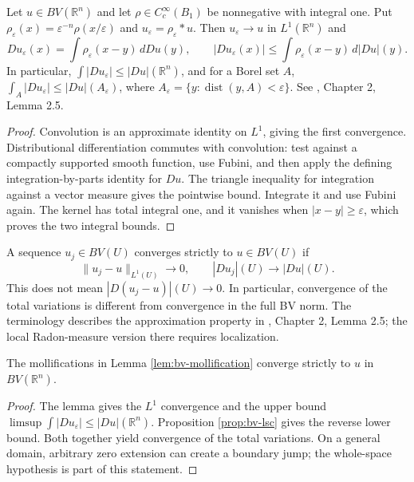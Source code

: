 \begin{lemma}\label{lem:bv-mollification}
Let $u\in BV(\mathbb R^n)$ and let $\rho\in C_c^\infty(B_1)$ be nonnegative with integral one. Put $\rho_\varepsilon(x)=\varepsilon^{-n}\rho(x/\varepsilon)$ and $u_\varepsilon=\rho_\varepsilon*u$. Then $u_\varepsilon\to u$ in $L^1(\mathbb R^n)$ and
\[
 Du_\varepsilon(x)=\int\rho_\varepsilon(x-y)\,dDu(y),
 \qquad |Du_\varepsilon(x)|\leq\int\rho_\varepsilon(x-y)\,d|Du|(y).
\]
In particular, $\int|Du_\varepsilon|\leq|Du|(\mathbb R^n)$, and for a Borel set $A$, $\int_A|Du_\varepsilon|\leq|Du|(A_\varepsilon)$, where $A_\varepsilon=\{y:\operatorname{dist}(y,A)<\varepsilon\}$. See \cite{Sim18}, Chapter 2, Lemma 2.5.
\end{lemma}
\begin{proof}
Convolution is an approximate identity on $L^1$, giving the first convergence. Distributional differentiation commutes with convolution: test against a compactly supported smooth function, use Fubini, and then apply the defining integration-by-parts identity for $Du$. The triangle inequality for integration against a vector measure gives the pointwise bound. Integrate it and use Fubini again. The kernel has total integral one, and it vanishes when $|x-y|\geq\varepsilon$, which proves the two integral bounds.
\end{proof}

\begin{definition}\label{def:bv-strict-convergence}
A sequence $u_j\in BV(U)$ converges strictly to $u\in BV(U)$ if
\[
 \|u_j-u\|_{L^1(U)}\to0,
 \qquad |Du_j|(U)\to|Du|(U).
\]
This does not mean $|D(u_j-u)|(U)\to0$. In particular, convergence of the total variations is different from convergence in the full BV norm. The terminology describes the approximation property in \cite{Sim18}, Chapter 2, Lemma 2.5; the local Radon-measure version there requires localization.
\end{definition}

\begin{corollary}\label{cor:bv-strict-mollification}
The mollifications in Lemma \ref{lem:bv-mollification} converge strictly to $u$ in $BV(\mathbb R^n)$.
\end{corollary}
\begin{proof}
The lemma gives the $L^1$ convergence and the upper bound $\limsup\int|Du_\varepsilon|\leq|Du|(\mathbb R^n)$. Proposition \ref{prop:bv-lsc} gives the reverse lower bound. Both together yield convergence of the total variations. On a general domain, arbitrary zero extension can create a boundary jump; the whole-space hypothesis is part of this statement.
\end{proof}


